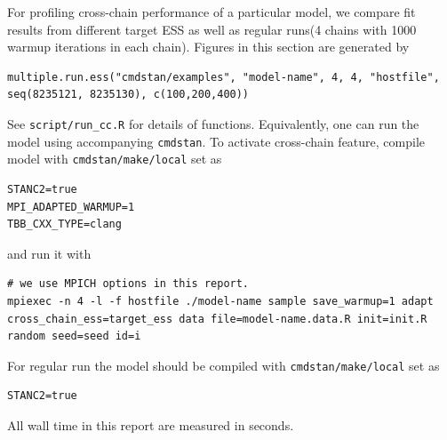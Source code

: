 \documentclass[11pt, reqno, oneside]{amsart}
\begin{document}
For profiling cross-chain performance of a particular model, we compare
fit results from different target ESS as well as regular runs(4 chains
with 1000 warmup iterations in each chain). Figures in this section
are generated by
\begin{verbatim}
multiple.run.ess("cmdstan/examples", "model-name", 4, 4, "hostfile", seq(8235121, 8235130), c(100,200,400))
\end{verbatim}
See \texttt{script/run_cc.R} for details of
functions. Equivalently, one can run the model using accompanying \texttt{cmdstan}.
To activate cross-chain feature, compile model with \texttt{cmdstan/make/local} set as
\begin{verbatim}
STANC2=true
MPI_ADAPTED_WARMUP=1
TBB_CXX_TYPE=clang
\end{verbatim}
and run it with
\begin{verbatim}
# we use MPICH options in this report.
mpiexec -n 4 -l -f hostfile ./model-name sample save_warmup=1 adapt cross_chain_ess=target_ess data file=model-name.data.R init=init.R random seed=seed id=i
\end{verbatim}
For regular run the model should be compiled with \texttt{cmdstan/make/local} set as
\begin{verbatim}
STANC2=true
\end{verbatim}
All wall time in this report are measured in seconds.
\end{document}
